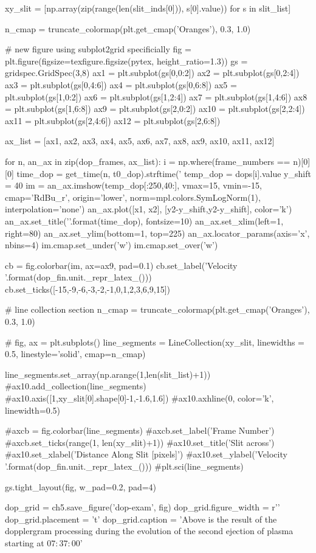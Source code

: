 \begin{pycode}[chapter5]
xy_slit = [np.array(zip(range(len(slit_inds[0])), s[0].value)) for s in slit_list]


n_cmap = truncate_colormap(plt.get_cmap('Oranges'), 0.3, 1.0)


# new figure using subplot2grid specificially
fig = plt.figure(figsize=texfigure.figsize(pytex, height_ratio=1.3))
gs = gridspec.GridSpec(3,8)
ax1 = plt.subplot(gs[0,0:2])
ax2 = plt.subplot(gs[0,2:4])
ax3 = plt.subplot(gs[0,4:6])
ax4 = plt.subplot(gs[0,6:8])
ax5 = plt.subplot(gs[1,0:2])
ax6 = plt.subplot(gs[1,2:4])
ax7 = plt.subplot(gs[1,4:6])
ax8 = plt.subplot(gs[1,6:8])
ax9 = plt.subplot(gs[2,0:2])
ax10 = plt.subplot(gs[2,2:4])
ax11 = plt.subplot(gs[2,4:6])
ax12 = plt.subplot(gs[2,6:8])
 
ax_list = [ax1, ax2, ax3, ax4, ax5, ax6,
           ax7, ax8, ax9, ax10, ax11, ax12]

for n, an_ax in zip(dop_frames, ax_list):
    i = np.where(frame_numbers == n)[0][0]
    time_dop = get_time(n, t0_dop).strftime('%
    temp_dop = dops[i].value
    y_shift = 40
    im = an_ax.imshow(temp_dop[:250,40:], vmax=15, vmin=-15,
                      cmap='RdBu_r', origin='lower',
                      norm=mpl.colors.SymLogNorm(1),
                      interpolation='none')
    an_ax.plot([x1, x2], [y2-y_shift,y2-y_shift], color='k')
    an_ax.set_title('{}'.format(time_dop), fontsize=10)
    an_ax.set_xlim(left=1, right=80)
    an_ax.set_ylim(bottom=1, top=225)
    an_ax.locator_params(axis='x', nbins=4)
    im.cmap.set_under('w')
    im.cmap.set_over('w')

cb = fig.colorbar(im, ax=ax9, pad=0.1)
cb.set_label('Velocity {}'.format(dop_fin.unit._repr_latex_()))
cb.set_ticks([-15,-9,-6,-3,-2,-1,0,1,2,3,6,9,15])

# line collection section
n_cmap = truncate_colormap(plt.get_cmap('Oranges'), 0.3, 1.0)

# fig, ax = plt.subplots()
line_segments = LineCollection(xy_slit,
                               linewidths = 0.5,
                               linestyle='solid',
                               cmap=n_cmap)

line_segments.set_array(np.arange(1,len(slit_list)+1))
#ax10.add_collection(line_segments)
#ax10.axis([1,xy_slit[0].shape[0]-1,-1.6,1.6])
#ax10.axhline(0, color='k', linewidth=0.5)

#axcb = fig.colorbar(line_segments)
#axcb.set_label('Frame Number')
#axcb.set_ticks(range(1, len(xy_slit)+1))
#ax10.set_title('Slit across')
#ax10.set_xlabel('Distance Along Slit [pixels]')
#ax10.set_ylabel('Velocity {}'.format(dop_fin.unit._repr_latex_()))
#plt.sci(line_segments)

gs.tight_layout(fig, w_pad=0.2, pad=4)

dop_grid = ch5.save_figure('dop-exam', fig)
dop_grid.figure_width = r'\textwidth'
dop_grid.placement = 't'
dop_grid.caption = 'Above is the result of the dopplergram processing during the evolution of the second ejection of plasma starting at $07:37:00$'


\end{pycode}

